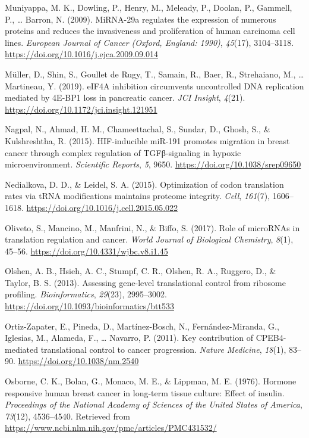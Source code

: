 \documentclass[12pt,openany]{book}
\begin{document}
\hypertarget{ref-Muniyappa2009}{}
Muniyappa, M. K., Dowling, P., Henry, M., Meleady, P., Doolan, P.,
Gammell, P., \ldots{} Barron, N. (2009). MiRNA-29a regulates the
expression of numerous proteins and reduces the invasiveness and
proliferation of human carcinoma cell lines. \emph{European Journal of
Cancer (Oxford, England: 1990)}, \emph{45}(17), 3104--3118.
\url{https://doi.org/10.1016/j.ejca.2009.09.014}

\hypertarget{ref-Muller2019}{}
Müller, D., Shin, S., Goullet de Rugy, T., Samain, R., Baer, R.,
Strehaiano, M., \ldots{} Martineau, Y. (2019). eIF4A inhibition
circumvents uncontrolled DNA replication mediated by 4E-BP1 loss in
pancreatic cancer. \emph{JCI Insight}, \emph{4}(21).
\url{https://doi.org/10.1172/jci.insight.121951}

\hypertarget{ref-Nagpal2015}{}
Nagpal, N., Ahmad, H. M., Chameettachal, S., Sundar, D., Ghosh, S., \&
Kulshreshtha, R. (2015). HIF-inducible miR-191 promotes migration in
breast cancer through complex regulation of TGFβ-signaling in hypoxic
microenvironment. \emph{Scientific Reports}, \emph{5}, 9650.
\url{https://doi.org/10.1038/srep09650}

\hypertarget{ref-Nedialkova2015}{}
Nedialkova, D. D., \& Leidel, S. A. (2015). Optimization of codon
translation rates via tRNA modifications maintains proteome integrity.
\emph{Cell}, \emph{161}(7), 1606--1618.
\url{https://doi.org/10.1016/j.cell.2015.05.022}

\hypertarget{ref-Oliveto2017}{}
Oliveto, S., Mancino, M., Manfrini, N., \& Biffo, S. (2017). Role of
microRNAs in translation regulation and cancer. \emph{World Journal of
Biological Chemistry}, \emph{8}(1), 45--56.
\url{https://doi.org/10.4331/wjbc.v8.i1.45}

\hypertarget{ref-Olshen2013}{}
Olshen, A. B., Hsieh, A. C., Stumpf, C. R., Olshen, R. A., Ruggero, D.,
\& Taylor, B. S. (2013). Assessing gene-level translational control from
ribosome profiling. \emph{Bioinformatics}, \emph{29}(23), 2995--3002.
\url{https://doi.org/10.1093/bioinformatics/btt533}

\hypertarget{ref-Ortiz-Zapater2011}{}
Ortiz-Zapater, E., Pineda, D., Martínez-Bosch, N., Fernández-Miranda,
G., Iglesias, M., Alameda, F., \ldots{} Navarro, P. (2011). Key
contribution of CPEB4-mediated translational control to cancer
progression. \emph{Nature Medicine}, \emph{18}(1), 83--90.
\url{https://doi.org/10.1038/nm.2540}

\hypertarget{ref-Osborne1976}{}
Osborne, C. K., Bolan, G., Monaco, M. E., \& Lippman, M. E. (1976).
Hormone responsive human breast cancer in long-term tissue culture:
Effect of insulin. \emph{Proceedings of the National Academy of Sciences
of the United States of America}, \emph{73}(12), 4536--4540. Retrieved
from \url{https://www.ncbi.nlm.nih.gov/pmc/articles/PMC431532/}
\end{document}
